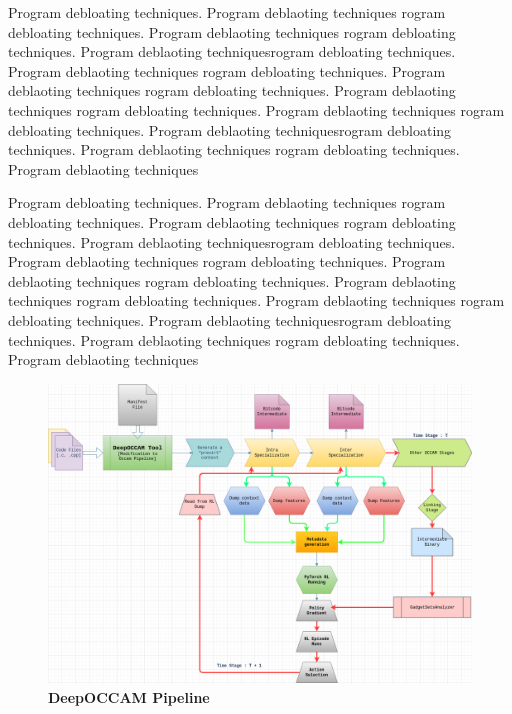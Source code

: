 \documentclass{relatorio}
\begin{document}
Program debloating techniques. Program deblaoting techniques rogram debloating techniques. Program deblaoting techniques
rogram debloating techniques. Program deblaoting techniquesrogram debloating techniques. Program deblaoting techniques
rogram debloating techniques. Program deblaoting techniques rogram debloating techniques. Program deblaoting techniques
rogram debloating techniques. Program deblaoting techniques 
rogram debloating techniques. Program deblaoting techniquesrogram debloating techniques. Program deblaoting techniques
rogram debloating techniques. Program deblaoting techniques

Program debloating techniques. Program deblaoting techniques rogram debloating techniques. Program deblaoting techniques
rogram debloating techniques. Program deblaoting techniquesrogram debloating techniques. Program deblaoting techniques
rogram debloating techniques. Program deblaoting techniques rogram debloating techniques. Program deblaoting techniques
rogram debloating techniques. Program deblaoting techniques 
rogram debloating techniques. Program deblaoting techniquesrogram debloating techniques. Program deblaoting techniques
rogram debloating techniques. Program deblaoting techniques

\onecolumn
\begin{figure}[H]
	\centering
	\captionsetup{justification=centering}
	\includegraphics[width=1\linewidth]{imgs/deepoccam-pipeline.png}
	\caption{\textbf{DeepOCCAM Pipeline}}%
	\label{fig:plant}
\end{figure}
\twocolumn
\end{document}
